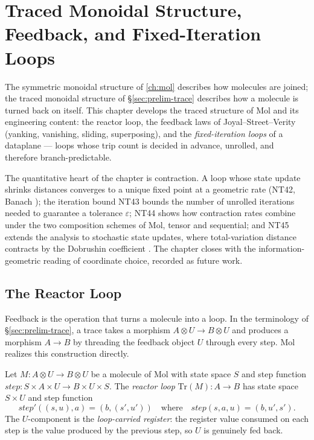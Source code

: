 \chapter{Traced Monoidal Structure, Feedback, and Fixed-Iteration Loops}\label{ch:trace}

The symmetric monoidal structure of \autoref{ch:mol} describes how molecules are joined; the traced monoidal structure of \S\ref{sec:prelim-trace} describes how a molecule is turned back on itself. This chapter develops the traced structure of Mol and its engineering content: the reactor loop, the feedback laws of Joyal--Street--Verity \citep{joyalsv} (yanking, vanishing, sliding, superposing), and the \emph{fixed-iteration loops} of a dataplane --- loops whose trip count is decided in advance, unrolled, and therefore branch-predictable.

The quantitative heart of the chapter is contraction. A loop whose state update shrinks distances converges to a unique fixed point at a geometric rate (NT42, Banach \citep{banach}); the iteration bound NT43 bounds the number of unrolled iterations needed to guarantee a tolerance $\varepsilon$; NT44 shows how contraction rates combine under the two composition schemes of Mol, tensor and sequential; and NT45 extends the analysis to stochastic state updates, where total-variation distance contracts by the Dobrushin coefficient \citep{dobroushin}. The chapter closes with the information-geometric reading of coordinate choice, recorded as future work.

\section{The Reactor Loop}\label{sec:trace-reactor}

Feedback is the operation that turns a molecule into a loop. In the terminology of \S\ref{sec:prelim-trace}, a trace takes a morphism $A \otimes U \to B \otimes U$ and produces a morphism $A \to B$ by threading the feedback object $U$ through every step. Mol realizes this construction directly.

\begin{definition}\label{def:reactor}
Let $M \colon A \otimes U \to B \otimes U$ be a molecule of Mol with state space $S$ and step function $\mathit{step} \colon S \times A \times U \to B \times U \times S$. The \emph{reactor loop} $\mathrm{Tr}(M) \colon A \to B$ has state space $S \times U$ and step function
\[ \mathit{step}'((s,u),a) = (b,(s',u')) \quad\text{where}\quad \mathit{step}(s,a,u) = (b,u',s'). \]
The $U$-component is the \emph{loop-carried register}: the register value consumed on each step is the value produced by the previous step, so $U$ is genuinely fed back.
\end{definition}

